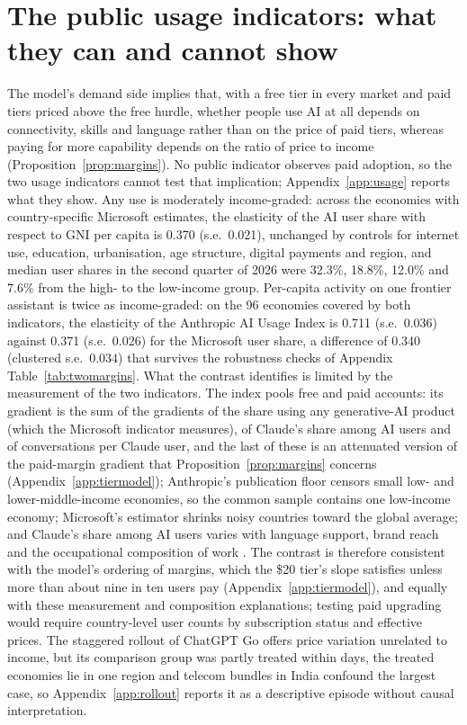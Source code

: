 \documentclass[11pt]{article}
\theoremstyle{definition}
\theoremstyle{remark}
\begin{document}
\section{The public usage indicators: what they can and cannot show}\label{sec:adoption}

The model's demand side implies that, with a free tier in every market and paid tiers priced above the free hurdle, whether people use AI at all depends on connectivity, skills and language rather than on the price of paid tiers, whereas paying for more capability depends on the ratio of price to income (Proposition~\ref{prop:margins}). No public indicator observes paid adoption, so the two usage indicators cannot test that implication; Appendix~\ref{app:usage} reports what they show. Any use is moderately income-graded: across the economies with country-specific Microsoft estimates, the elasticity of the AI user share with respect to GNI per capita is 0.370 (s.e.\ 0.021), unchanged by controls for internet use, education, urbanisation, age structure, digital payments and region, and median user shares in the second quarter of 2026 were 32.3\%, 18.8\%, 12.0\% and 7.6\% from the high- to the low-income group. Per-capita activity on one frontier assistant is twice as income-graded: on the 96 economies covered by both indicators, the elasticity of the Anthropic AI Usage Index is 0.711 (s.e.\ 0.036) against 0.371 (s.e.\ 0.026) for the Microsoft user share, a difference of 0.340 (clustered s.e.\ 0.034) that survives the robustness checks of Appendix Table~\ref{tab:twomargins}. What the contrast identifies is limited by the measurement of the two indicators. The index pools free and paid accounts: its gradient is the sum of the gradients of the share using any generative-AI product (which the Microsoft indicator measures), of Claude's share among AI users and of conversations per Claude user, and the last of these is an attenuated version of the paid-margin gradient that Proposition~\ref{prop:margins} concerns (Appendix~\ref{app:tiermodel}); Anthropic's publication floor censors small low- and lower-middle-income economies, so the common sample contains one low-income economy; Microsoft's estimator shrinks noisy countries toward the global average; and Claude's share among AI users varies with language support, brand reach and the occupational composition of work \citep{daepp2026how,gmyrek2025generative}. The contrast is therefore consistent with the model's ordering of margins, which the \$20 tier's slope satisfies unless more than about nine in ten users pay (Appendix~\ref{app:tiermodel}), and equally with these measurement and composition explanations; testing paid upgrading would require country-level user counts by subscription status and effective prices. The staggered rollout of ChatGPT Go offers price variation unrelated to income, but its comparison group was partly treated within days, the treated economies lie in one region and telecom bundles in India confound the largest case, so Appendix~\ref{app:rollout} reports it as a descriptive episode without causal interpretation.
\end{document}
